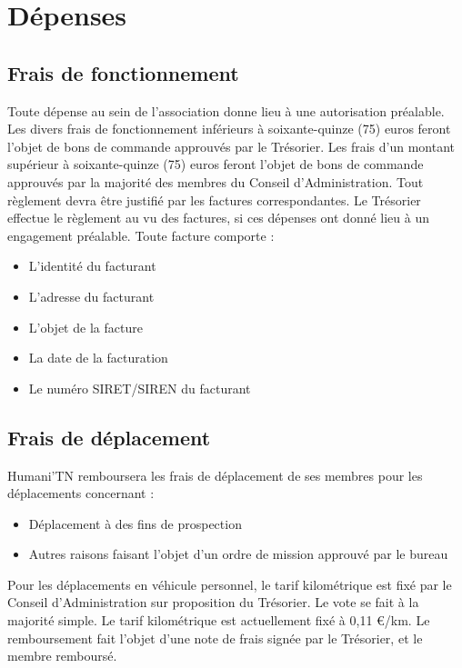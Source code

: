 \documentclass[12pt]{article}
\begin{document}
\section{Dépenses}
\label{sec:depenses}


\subsection{Frais de fonctionnement}
\label{sec:depenses:fonctionnement}

Toute dépense au sein de l’association donne lieu à une autorisation préalable.
Les divers frais de fonctionnement inférieurs à soixante-quinze (75) euros feront l’objet de bons de commande
approuvés par le Trésorier. Les frais d’un montant supérieur à soixante-quinze (75) euros feront l’objet de bons
de commande approuvés par la majorité des membres du Conseil d’Administration.
Tout règlement devra être justifié par les factures correspondantes. Le Trésorier effectue le règlement au vu
des factures, si ces dépenses ont donné lieu à un engagement préalable.
Toute facture comporte :
\begin{itemize}
	\item L’identité du facturant
	\item L’adresse du facturant
	\item L’objet de la facture
	\item La date de la facturation
	\item Le numéro SIRET/SIREN du facturant
\end{itemize}


\subsection{Frais de déplacement}
\label{sec:depenses:deplacement}

Humani'TN remboursera les frais de déplacement de ses membres pour les déplacements concernant :
\begin{itemize}
	\item Déplacement à des fins de prospection
	\item Autres raisons faisant l’objet d’un ordre de mission approuvé par le bureau
\end{itemize}

Pour les déplacements en véhicule personnel, le tarif kilométrique est fixé par le Conseil d’Administration sur
proposition du Trésorier. Le vote se fait à la majorité simple.
Le tarif kilométrique est actuellement fixé à 0,11 €/km.
Le remboursement fait l’objet d’une note de frais signée par le Trésorier, et le membre remboursé.
\end{document}
